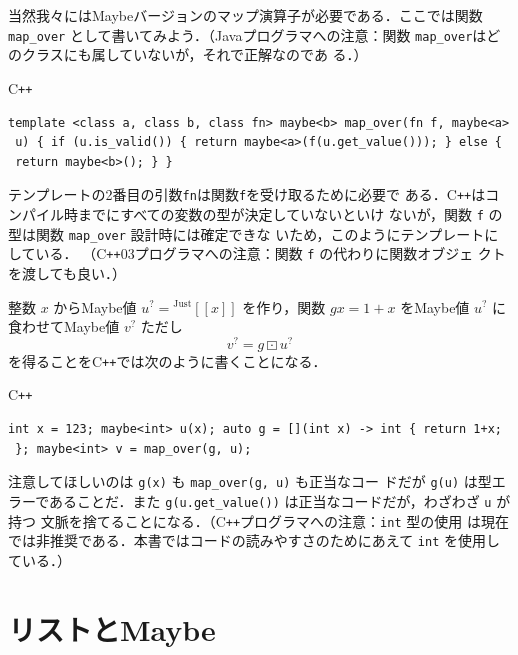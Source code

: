 \documentclass[a5paper,twoside,fleqn]{jsbook}
\def\[{\left[\!\left[}
\def\]{\right]\!\right]}
\newcommand{\programminglanguage}[1]{\textsf{#1}}
\newcommand{\cxx}{\programminglanguage{C}\texttt{++}}
\newcommand{\cxxzerothree}{\cxx\programminglanguage{03}}
\newcommand{\java}{\programminglanguage{Java}}
\newcommand{\code}[1]{\texttt{#1}}
\newenvironment{cxxcode}{\begin{itembox}[r]{\cxx}}{\end{itembox}}
\DeclareMathOperator{\mMapMaybe}{\boxdot}
\newcommand{\mGenericValueConstructor}[1]{\mathrm{#1}}
\newcommand{\mGenericWith}[2]{{}^\mGenericValueConstructor{#1}\[#2\]}
\newcommand{\mJustWith}[1]{\mGenericWith{Just}{#1}}
\newcommand{\mMaybe}[1]{{#1}^?}
\begin{document}
当然我々にはMaybeバージョンのマップ演算子が必要である．ここでは関数
\code{map\_over} として書いてみよう．（\java プログラマへの注意：関数
  \code{map\_over}はどのクラスにも属していないが，それで正解なのであ
  る．）
\begin{cxxcode}
\begin{verbatim}
template <class a, class b, class fn> maybe<b> map_over(fn f, maybe<a>
 u) { if (u.is_valid()) { return maybe<a>(f(u.get_value())); } else {
 return maybe<b>(); } }
\end{verbatim}
\end{cxxcode}
テンプレートの2番目の引数\code{fn}は関数\code{f}を受け取るために必要で
ある．\cxx はコンパイル時までにすべての変数の型が決定していないといけ
ないが，関数 \code{f} の型は関数 \code{map\_over} 設計時には確定できな
いため，このようにテンプレートにしている．
（\cxxzerothree プログラマへの注意：関数 \code{f} の代わりに関数オブジェ
  クトを渡しても良い．）

整数 $x$ からMaybe値 $\mMaybe{u}=\mJustWith{x}$ を作り，関数 $gx=1+x$
をMaybe値 $\mMaybe{u}$ に食わせてMaybe値 $\mMaybe{v}$ ただし
\begin{equation}
\mMaybe{v}=g\mMapMaybe\mMaybe{u}
\end{equation}
を得ることを\cxx では次のように書くことになる．
\begin{cxxcode}
\begin{verbatim}
int x = 123; maybe<int> u(x); auto g = [](int x) -> int { return 1+x;
 }; maybe<int> v = map_over(g, u);
\end{verbatim}
\end{cxxcode}
注意してほしいのは \code{g(x)} も \code{map\_over(g, u)} も正当なコー
ドだが \code{g(u)} は型エラーであることだ．また
\code{g(u.get\_value())} は正当なコードだが，わざわざ \code{u} が持つ
文脈を捨てることになる．（\cxx プログラマへの注意：\code{int} 型の使用
  は現在では非推奨である．本書ではコードの読みやすさのためにあえて
  \code{int} を使用している．）


\section{リストとMaybe}
\end{document}
